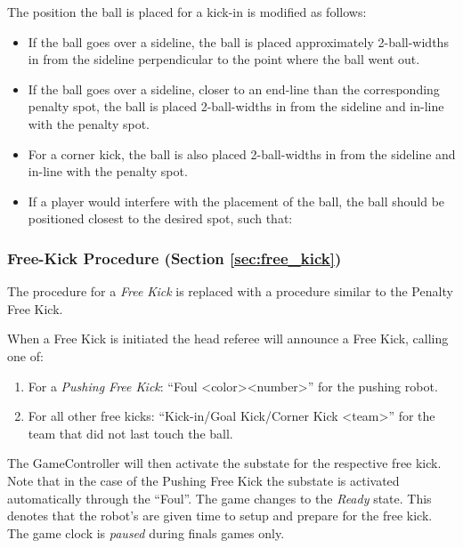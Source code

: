The position the ball is placed for a kick-in is modified as follows:
\begin{itemize}
    \item If the ball goes over a sideline, the ball is placed approximately 2-ball-widths in from the sideline perpendicular to the point where the ball went out.
    \item If the ball goes over a sideline, closer to an end-line than the corresponding penalty spot, the ball is placed 2-ball-widths in from the sideline and in-line with the penalty spot.
    \item For a corner kick, the ball is also placed 2-ball-widths in from the sideline and in-line with the penalty spot.
    \item If a player would interfere with the placement of the ball, the ball should be positioned closest to the desired spot, such that:
\end{itemize}

\subsubsection{Free-Kick Procedure (Section \ref{sec:free_kick})}

The procedure for a \emph{Free Kick} is replaced with a procedure similar to the Penalty Free Kick.

When a Free Kick is initiated the head referee will announce a Free Kick, calling one of:
\begin{enumerate}
  \item For a \textit{Pushing Free Kick}: ``Foul \textless color\textgreater \textless number\textgreater'' for the pushing robot.
  \item For all other free kicks: ``Kick-in/Goal Kick/Corner Kick \textless team\textgreater'' for the team that did not last touch the ball.
\end{enumerate}

The GameController will then activate the substate for the respective free kick. Note that in the case of the Pushing Free Kick the substate is activated automatically through the ``Foul''.
The game changes to the \textit{Ready} state.
This denotes that the robot's are given time to setup and prepare for the free kick.
The game clock is \textit{paused} during finals games only.

